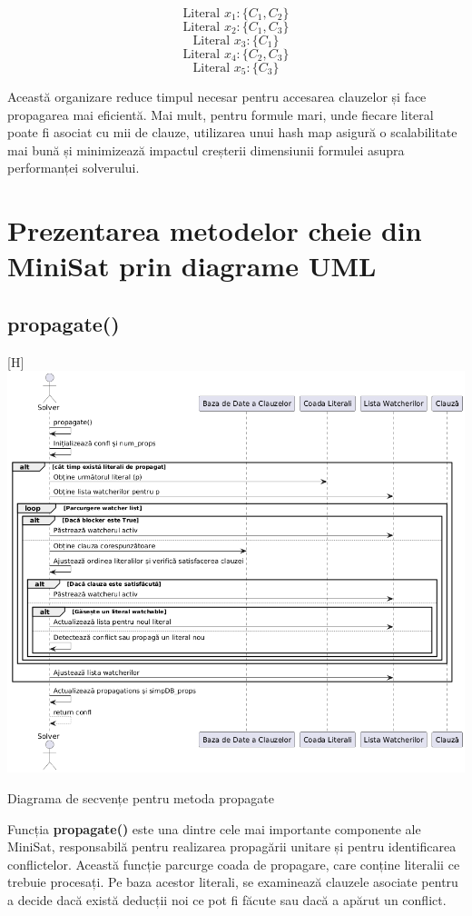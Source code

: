 \documentclass[runningheads]{llncs}
\begin{document}
\[
\text{Literal } x_1: \{C_1, C_2\}
\]
\[
\text{Literal } x_2: \{C_1, C_3\}
\]
\[
\text{Literal } x_3: \{C_1\}
\]
\[
\text{Literal } x_4: \{C_2, C_3\}
\]
\[
\text{Literal } x_5: \{C_3\}
\]

Această organizare reduce timpul necesar pentru accesarea clauzelor și face propagarea mai eficientă. Mai mult, pentru formule mari, unde fiecare literal poate fi asociat cu mii de clauze, utilizarea unui hash map asigură o scalabilitate mai bună și minimizează impactul creșterii dimensiunii formulei asupra performanței solverului.
\section{Prezentarea metodelor cheie din MiniSat prin diagrame UML}  

\subsection{propagate()}  
\begin{center}[H]
    \includegraphics[width=1.0\textwidth]{images/diagrams/pseudo_code/propagate_romana_2.png}
    \caption{Diagrama de secvențe pentru metoda propagate}
    
\end{center}  

Funcția \textbf{propagate()} este una dintre cele mai importante componente ale MiniSat, responsabilă pentru realizarea propagării unitare și pentru identificarea conflictelor. Această funcție parcurge coada de propagare, care conține literalii ce trebuie procesați. Pe baza acestor literali, se examinează clauzele asociate pentru a decide dacă există deducții noi ce pot fi făcute sau dacă a apărut un conflict.
\end{document}
